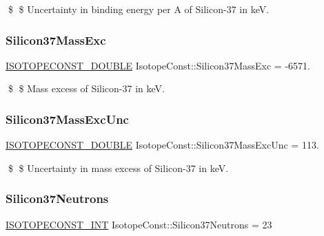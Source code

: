 \$ \$ Uncertainty in binding energy per A of Silicon-\/37 in keV. \mbox{\label{group___isotope_const-_silicon-_si37_ga9b170c2e9742ba063a2a5ab42919bc8b}} 
\subsubsection{\texorpdfstring{Silicon37\+Mass\+Exc}{Silicon37MassExc}}
{\footnotesize\ttfamily \mbox{\hyperlink{group___isotope_const-_macros_ga8f45a7272ce02c0b4c65c44636ed719a}{I\+S\+O\+T\+O\+P\+E\+C\+O\+N\+S\+T\+\_\+\+D\+O\+U\+B\+LE}} Isotope\+Const\+::\+Silicon37\+Mass\+Exc = -\/6571.}

\$ \$ Mass excess of Silicon-\/37 in keV. \mbox{\label{group___isotope_const-_silicon-_si37_ga139a6b83ace61048695079a99c695b92}} 
\subsubsection{\texorpdfstring{Silicon37\+Mass\+Exc\+Unc}{Silicon37MassExcUnc}}
{\footnotesize\ttfamily \mbox{\hyperlink{group___isotope_const-_macros_ga8f45a7272ce02c0b4c65c44636ed719a}{I\+S\+O\+T\+O\+P\+E\+C\+O\+N\+S\+T\+\_\+\+D\+O\+U\+B\+LE}} Isotope\+Const\+::\+Silicon37\+Mass\+Exc\+Unc = 113.}

\$ \$ Uncertainty in mass excess of Silicon-\/37 in keV. \mbox{\label{group___isotope_const-_silicon-_si37_gae384b92e5328dbd0e4b34cd60500f507}} 
\subsubsection{\texorpdfstring{Silicon37\+Neutrons}{Silicon37Neutrons}}
{\footnotesize\ttfamily \mbox{\hyperlink{group___isotope_const-_macros_ga5f18360b3e99483a35c32d789e62621c}{I\+S\+O\+T\+O\+P\+E\+C\+O\+N\+S\+T\+\_\+\+I\+NT}} Isotope\+Const\+::\+Silicon37\+Neutrons = 23}

